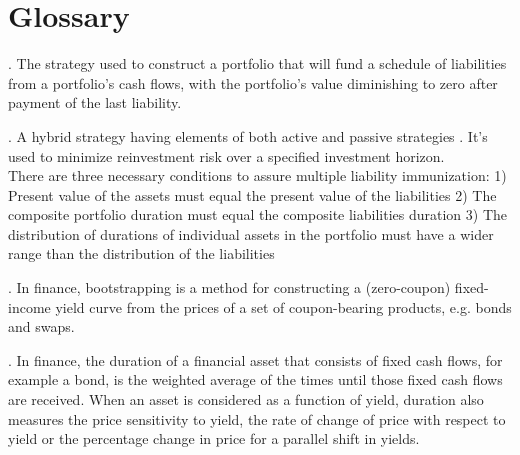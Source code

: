 \documentclass[oneside,12pt]{report}
\begin{document}
\chapter{Glossary}\label{Glossary}

\vspace{12pt} 

\vspace{8pt}
. The strategy used to construct a portfolio that will fund a schedule of liabilities from a portfolio's cash flows, with the portfolio's value diminishing to zero after payment of the last liability. 

\vspace{8pt}
. A hybrid strategy having elements of both active and passive strategies . It's used to minimize reinvestment risk over a specified investment horizon.\\
There are three necessary conditions to assure multiple liability immunization:
1) Present value of the assets must equal the present value of the liabilities
2) The composite portfolio duration must equal the composite liabilities duration
3) The distribution of durations of individual assets in the portfolio must have a wider range than the distribution of the liabilities


\vspace{8pt}
. In finance, bootstrapping is a method for constructing a (zero-coupon) fixed-income yield curve from the prices of a set of coupon-bearing products, e.g. bonds and swaps.

\vspace{8pt} . In finance, the duration of a financial asset that consists of fixed cash flows, for example a bond, is the weighted average of the times until those fixed cash flows are received. When an asset is considered as a function of yield, duration also measures the price sensitivity to yield, the rate of change of price with respect to yield or the percentage change in price for a parallel shift in yields.





\end{document}
